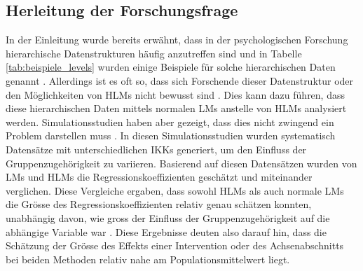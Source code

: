 \documentclass[12pt, a4paper]{article}\usepackage[]{graphicx}\usepackage[]{color}
\begin{document}
\subsection{Herleitung der Forschungsfrage}
In der Einleitung wurde bereits erwähnt, dass in der psychologischen Forschung hierarchische Datenstrukturen häufig anzutreffen sind und in Tabelle \ref{tab:beispiele_levels} wurden einige Beispiele für solche hierarchischen Daten genannt \citep{raudenbush2002hierarchical,SnijdersTomA.B2012Ma:a,woltman2012introduction}. Allerdings ist es oft so, dass sich Forschende dieser Datenstruktur oder den Möglichkeiten von HLMs nicht bewusst sind \citep{mcneish2014analyzing}. Dies kann dazu führen, dass diese hierarchischen Daten mittels normalen LMs anstelle von HLMs analysiert werden. Simulationsstudien haben aber gezeigt, dass dies nicht zwingend ein Problem darstellen muss \citep{mcneish2014analyzing, mundfrom2002monte}. In diesen Simulationsstudien wurden systematisch Datensätze mit unterschiedlichen IKKs generiert, um den Einfluss der Gruppenzugehörigkeit zu variieren. Basierend auf diesen Datensätzen wurden von LMs und HLMs die Regressionskoeffizienten geschätzt und miteinander verglichen. Diese Vergleiche ergaben, dass sowohl HLMs als auch normale LMs die Grösse des Regressionskoeffizienten relativ genau schätzen konnten, unabhängig davon, wie gross der Einfluss der Gruppenzugehörigkeit auf die abhängige Variable war  \citep{mcneish2014analyzing, mundfrom2002monte}. Diese Ergebnisse deuten also darauf hin, dass die Schätzung der Grösse des Effekts einer Intervention oder des Achsenabschnitts bei beiden Methoden relativ nahe am Populationsmittelwert liegt.
\end{document}
